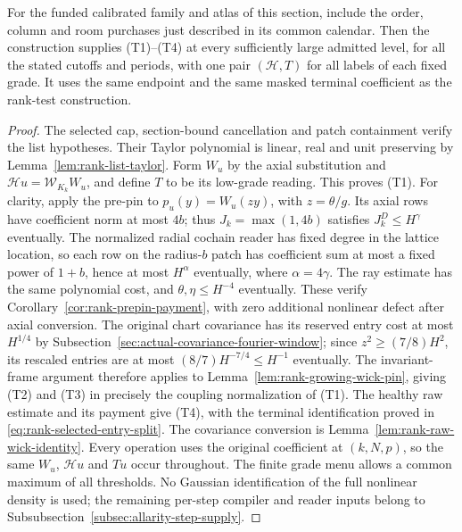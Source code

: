 \begin{proposition}
\label{prop:rank-selected-tested-readout}
For the funded calibrated family and atlas of this section, include
the order, column and room purchases just described in its common
calendar. Then the construction supplies (T1)--(T4) at every
sufficiently large admitted level, for all the stated cutoffs and
periods, with one pair $(\mathcal H,T)$ for all labels of each
fixed grade. It uses the same endpoint and the same masked terminal
coefficient as the rank-test construction.
\end{proposition}
\begin{proof}
The selected cap, section-bound cancellation and patch containment
verify the list hypotheses. Their Taylor polynomial is linear, real
and unit preserving by Lemma~\ref{lem:rank-list-taylor}. Form $W_u$
by the axial substitution and $\mathcal Hu=\mathcal W_{K_k}W_u$,
and define $T$ to be its low-grade reading. This proves (T1).
For clarity, apply the pre-pin to $p_u(y)=W_u(zy)$, with
$z=\theta/g$. Its axial rows have coefficient norm at most $4b$;
thus $J_k=\max(1,4b)$ satisfies $J_k^D\le H^\gamma$ eventually.
The normalized radial cochain reader has fixed degree in the lattice
location, so each row on the radius-$b$ patch has coefficient sum
at most a fixed power of $1+b$, hence at most $H^\alpha$ eventually,
where $\alpha=4\gamma$. The ray estimate has the same polynomial
cost, and $\theta,\eta\le H^{-4}$ eventually. These verify
Corollary~\ref{cor:rank-prepin-payment}, with zero additional
nonlinear defect after axial conversion. The original chart covariance
has its reserved entry cost at most $H^{1/4}$ by
Subsection~\ref{sec:actual-covariance-fourier-window}; since
$z^2\ge(7/8)H^2$, its rescaled entries are at most
$(8/7)H^{-7/4}\le H^{-1}$ eventually. The invariant-frame argument
therefore applies to Lemma~\ref{lem:rank-growing-wick-pin}, giving
(T2) and (T3) in precisely the coupling normalization of (T1).
The healthy raw estimate and its payment give (T4), with the terminal
identification proved in \eqref{eq:rank-selected-entry-split}.
The covariance conversion is Lemma~\ref{lem:rank-raw-wick-identity}.
Every operation uses the original coefficient at $(k,N,p)$, so the
same $W_u$, $\mathcal Hu$ and $Tu$ occur throughout. The finite grade
menu allows a common maximum of all thresholds. No Gaussian
identification of the full nonlinear density is used; the remaining
per-step compiler and reader inputs belong to
Subsubsection~\ref{subsec:allarity-step-supply}.
\end{proof}

